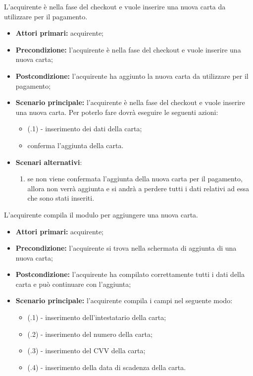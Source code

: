 
L'acquirente è nella fase del checkout e vuole inserire una nuova carta da utilizzare per il pagamento.
\begin{itemize}
    \item \textbf{Attori primari:} acquirente;
    \item \textbf{Precondizione:} l'acquirente è nella fase del checkout e vuole inserire una nuova carta;
    \item \textbf{Postcondizione:} l'acquirente ha aggiunto la nuova carta da utilizzare per il pagamento;
    \item \textbf{Scenario principale:} l'acquirente è nella fase del checkout e vuole inserire una nuova carta. Per poterlo fare dovrà eseguire le seguenti azioni:
    \begin{itemize}
        \item (\actualUC.1) - inserimento dei dati della carta;
        \item conferma l'aggiunta della carta.
    \end{itemize}
    \item \textbf{Scenari alternativi}:
    \begin{enumerate}[label=\lett]
        \item se non viene confermata l'aggiunta della nuova carta per il pagamento, allora non verrà aggiunta e si andrà a perdere tutti i dati relativi ad essa che sono stati inseriti.
    \end{enumerate}
\end{itemize}

\resetSubUC

L'acquirente compila il modulo per aggiungere una nuova carta.
\begin{itemize}
	\item \textbf{Attori primari:} acquirente;
	\item \textbf{Precondizione:} l'acquirente si trova nella schermata di aggiunta di una nuova carta;
	\item \textbf{Postcondizione:} l'acquirente ha compilato correttamente tutti i dati della carta e può continuare con l'aggiunta;
	\item \textbf{Scenario principale:} l'acquirente compila i campi nel seguente modo:
	\begin{itemize}
		\item (\actualSubUC.1) - inserimento dell'intestatario della carta;
		\item (\actualSubUC.2) - inserimento del numero della carta;
		\item (\actualSubUC.3) - inserimento del CVV della carta;
		\item (\actualSubUC.4) - inserimento della data di scadenza della carta.
	\end{itemize}
\end{itemize}

